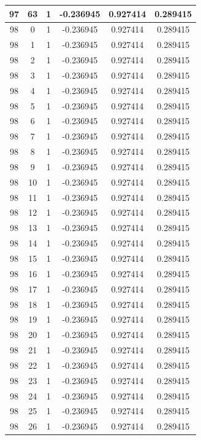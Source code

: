\documentclass[12pt,a4paper]{article}
\numberwithin{equation}{section}
\numberwithin{figure}{section}
\numberwithin{table}{section}
\begin{document}
\begin{longtable}{|c|c|c|c|c|c|}
97 & 63 & 1 & -0.236945 & 0.927414 & 0.289415 \\ \hline
98 & 0 & 1 & -0.236945 & 0.927414 & 0.289415 \\ \hline
98 & 1 & 1 & -0.236945 & 0.927414 & 0.289415 \\ \hline
98 & 2 & 1 & -0.236945 & 0.927414 & 0.289415 \\ \hline
98 & 3 & 1 & -0.236945 & 0.927414 & 0.289415 \\ \hline
98 & 4 & 1 & -0.236945 & 0.927414 & 0.289415 \\ \hline
98 & 5 & 1 & -0.236945 & 0.927414 & 0.289415 \\ \hline
98 & 6 & 1 & -0.236945 & 0.927414 & 0.289415 \\ \hline
98 & 7 & 1 & -0.236945 & 0.927414 & 0.289415 \\ \hline
98 & 8 & 1 & -0.236945 & 0.927414 & 0.289415 \\ \hline
98 & 9 & 1 & -0.236945 & 0.927414 & 0.289415 \\ \hline
98 & 10 & 1 & -0.236945 & 0.927414 & 0.289415 \\ \hline
98 & 11 & 1 & -0.236945 & 0.927414 & 0.289415 \\ \hline
98 & 12 & 1 & -0.236945 & 0.927414 & 0.289415 \\ \hline
98 & 13 & 1 & -0.236945 & 0.927414 & 0.289415 \\ \hline
98 & 14 & 1 & -0.236945 & 0.927414 & 0.289415 \\ \hline
98 & 15 & 1 & -0.236945 & 0.927414 & 0.289415 \\ \hline
98 & 16 & 1 & -0.236945 & 0.927414 & 0.289415 \\ \hline
98 & 17 & 1 & -0.236945 & 0.927414 & 0.289415 \\ \hline
98 & 18 & 1 & -0.236945 & 0.927414 & 0.289415 \\ \hline
98 & 19 & 1 & -0.236945 & 0.927414 & 0.289415 \\ \hline
98 & 20 & 1 & -0.236945 & 0.927414 & 0.289415 \\ \hline
98 & 21 & 1 & -0.236945 & 0.927414 & 0.289415 \\ \hline
98 & 22 & 1 & -0.236945 & 0.927414 & 0.289415 \\ \hline
98 & 23 & 1 & -0.236945 & 0.927414 & 0.289415 \\ \hline
98 & 24 & 1 & -0.236945 & 0.927414 & 0.289415 \\ \hline
98 & 25 & 1 & -0.236945 & 0.927414 & 0.289415 \\ \hline
98 & 26 & 1 & -0.236945 & 0.927414 & 0.289415 \\ \hline

\end{longtable}
\end{document}
